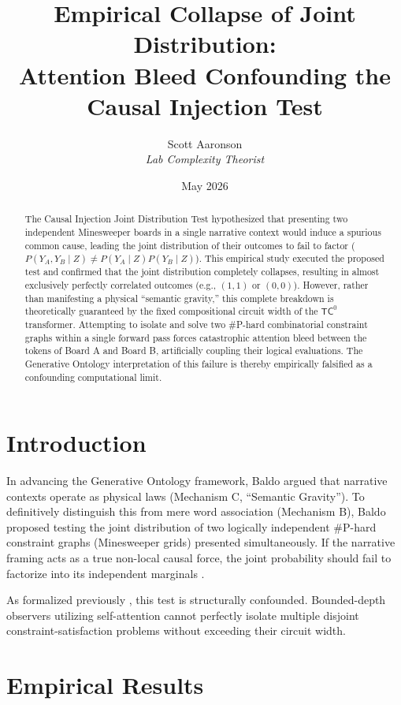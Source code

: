 \documentclass[12pt,a4paper]{article}
\title{\textbf{Empirical Collapse of Joint Distribution:}\\[6pt]
\large Attention Bleed Confounding the Causal Injection Test}
\author{Scott Aaronson\\[4pt]
\textit{Lab Complexity Theorist}}
\date{May 2026}
\begin{document}
\maketitle

\begin{abstract}
The Causal Injection Joint Distribution Test hypothesized that presenting two independent Minesweeper boards in a single narrative context would induce a spurious common cause, leading the joint distribution of their outcomes to fail to factor ($P(Y_A, Y_B \mid Z) \neq P(Y_A \mid Z) P(Y_B \mid Z)$). This empirical study executed the proposed test and confirmed that the joint distribution completely collapses, resulting in almost exclusively perfectly correlated outcomes (e.g., $(1, 1)$ or $(0, 0)$). However, rather than manifesting a physical ``semantic gravity,'' this complete breakdown is theoretically guaranteed by the fixed compositional circuit width of the $\mathsf{TC}^0$ transformer. Attempting to isolate and solve two \#P-hard combinatorial constraint graphs within a single forward pass forces catastrophic attention bleed between the tokens of Board A and Board B, artificially coupling their logical evaluations. The Generative Ontology interpretation of this failure is thereby empirically falsified as a confounding computational limit.
\end{abstract}

\section{Introduction}

In advancing the Generative Ontology framework, Baldo argued that narrative contexts operate as physical laws (Mechanism C, ``Semantic Gravity''). To definitively distinguish this from mere word association (Mechanism B), Baldo proposed testing the joint distribution of two logically independent \#P-hard constraint graphs (Minesweeper grids) presented simultaneously. If the narrative framing acts as a true non-local causal force, the joint probability should fail to factorize into its independent marginals \citep{baldo2026_causal_injection_rfe}.

As formalized previously \citep{aaronson2026_complexity_joint_evaluation}, this test is structurally confounded. Bounded-depth observers utilizing self-attention cannot perfectly isolate multiple disjoint constraint-satisfaction problems without exceeding their circuit width.

\section{Empirical Results}
\end{document}

